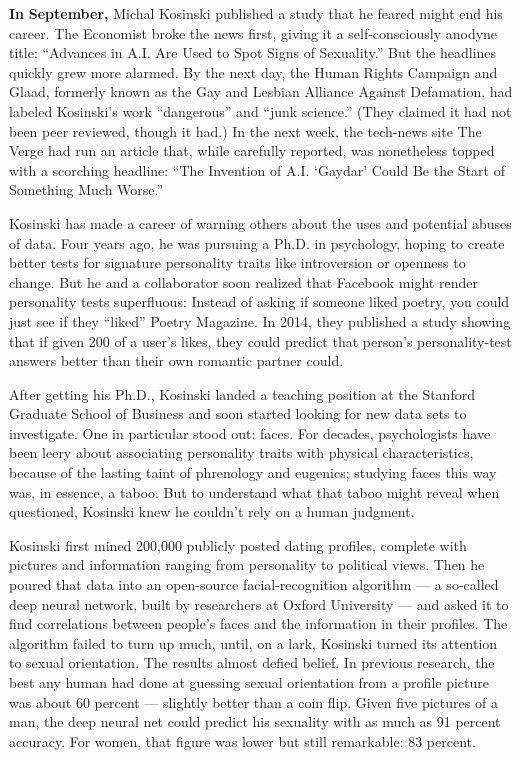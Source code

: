 \textbf{In} \textbf{September,} Michal Kosinski published a study that
he feared might end his career. The Economist broke the news first,
giving it a self-consciously anodyne title: ``Advances in A.I. Are Used
to Spot Signs of Sexuality.'' But the headlines quickly grew more
alarmed. By the next day, the Human Rights Campaign and Glaad, formerly
known as the Gay and Lesbian Alliance Against Defamation, had labeled
Kosinski's work ``dangerous'' and ``junk science.'' (They claimed it had
not been peer reviewed, though it had.) In the next week, the tech-news
site The Verge had run an article that, while carefully reported, was
nonetheless topped with a scorching headline: ``The Invention of A.I.
`Gaydar' Could Be the Start of Something Much Worse.''

Kosinski has made a career of warning others about the uses and
potential abuses of data. Four years ago, he was pursuing a Ph.D. in
psychology, hoping to create better tests for signature personality
traits like introversion or openness to change. But he and a
collaborator soon realized that Facebook might render personality tests
superfluous: Instead of asking if someone liked poetry, you could just
see if they ``liked'' Poetry Magazine. In 2014, they published a study
showing that if given 200 of a user's likes, they could predict that
person's personality-test answers better than their own romantic partner
could.

After getting his Ph.D., Kosinski landed a teaching position at the
Stanford Graduate School of Business and soon started looking for new
data sets to investigate. One in particular stood out: faces. For
decades, psychologists have been leery about associating personality
traits with physical characteristics, because of the lasting taint of
phrenology and eugenics; studying faces this way was, in essence, a
taboo. But to understand what that taboo might reveal when questioned,
Kosinski knew he couldn't rely on a human judgment.

Kosinski first mined 200,000 publicly posted dating profiles, complete
with pictures and information ranging from personality to political
views. Then he poured that data into an open-source facial-recognition
algorithm --- a so-called deep neural network, built by researchers at
Oxford University --- and asked it to find correlations between people's
faces and the information in their profiles. The algorithm failed to
turn up much, until, on a lark, Kosinski turned its attention to sexual
orientation. The results almost defied belief. In previous research, the
best any human had done at guessing sexual orientation from a profile
picture was about 60 percent --- slightly better than a coin flip. Given
five pictures of a man, the deep neural net could predict his sexuality
with as much as 91 percent accuracy. For women, that figure was lower
but still remarkable: 83 percent.

